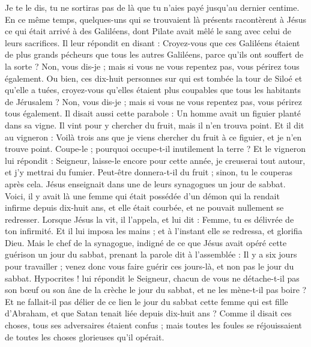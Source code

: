 \begin{multicols}{2}
Je te le dis, tu ne sortiras pas de là que tu n'aies payé jusqu'au dernier centime.
\VerseOne{}En ce même temps, quelques-uns qui se trouvaient là présents racontèrent à Jésus ce qui était arrivé à des Galiléens, dont Pilate avait mêlé le sang avec celui de leurs sacrifices.
Il leur répondit en disant : Croyez-vous que ces Galiléens étaient de plus grands pécheurs que tous les autres Galiléens, parce qu'ils ont souffert de la sorte ?
Non, vous dis-je ; mais si vous ne vous repentez pas, vous périrez tous également.
Ou bien, ces dix-huit personnes sur qui est tombée la tour de Siloé et qu'elle a tuées, croyez-vous qu'elles étaient plus coupables que tous les habitants de Jérusalem ?
Non, vous dis-je ; mais si vous ne vous repentez pas, vous périrez tous également.
Il disait aussi cette parabole : Un homme avait un figuier planté dans sa vigne. Il vint pour y chercher du fruit, mais il n'en trouva point.
Et il dit au vigneron : Voilà trois ans que je viens chercher du fruit à ce figuier, et je n'en trouve point. Coupe-le ; pourquoi occupe-t-il inutilement la terre ?
Et le vigneron lui répondit : Seigneur, laisse-le encore pour cette année, je creuserai tout autour, et j'y mettrai du fumier.
Peut-être donnera-t-il du fruit ; sinon, tu le couperas après cela.
Jésus enseignait dans une de leurs synagogues un jour de sabbat.
Voici, il y avait là une femme qui était possédée d'un démon qui la rendait infirme depuis dix-huit ans, et elle était courbée, et ne pouvait nullement se redresser.
Lorsque Jésus la vit, il l'appela, et lui dit : Femme, tu es délivrée de ton infirmité.
Et il lui imposa les mains ; et à l'instant elle se redressa, et glorifia Dieu.
Mais le chef de la synagogue, indigné de ce que Jésus avait opéré cette guérison un jour du sabbat, prenant la parole dit à l'assemblée : Il y a six jours pour travailler ; venez donc vous faire guérir ces jours-là, et non pas le jour du sabbat.
Hypocrites ! lui répondit le Seigneur, chacun de vous ne détache-t-il pas son bœuf ou son âne de la crèche le jour du sabbat, et ne les mène-t-il pas boire ?
Et ne fallait-il pas délier de ce lien le jour du sabbat cette femme qui est fille d'Abraham, et que Satan tenait liée depuis dix-huit ans ?
Comme il disait ces choses, tous ses adversaires étaient confus ; mais toutes les foules se réjouissaient de toutes les choses glorieuses qu'il opérait.

\end{multicols}
